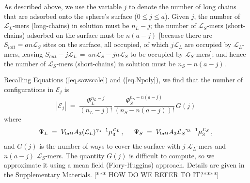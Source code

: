 \documentclass[journal=mamobx,manuscript=article]{achemso}
\newcommand{\leng}{\mathcal{L}}
\begin{document}
 As described above, we use the variable $j$ to 
 denote the number of long chains that are adsorbed
 onto the sphere's surface ($0\leq j\leq a$).
 Given $j$, the number of $\leng_L$-mers (long-chains) in solution must be $n_L-j$; 
 the number of $\leng_S$-mers (short-chains) adsorbed on the surface must be $n(a-j)$ [because there are $S_{latt}=an\leng_S$ sites on the surface, all occupied, of which $j\leng_L$ are occupied by $\leng_L$-mers, leaving $S_{latt}-j\leng_L\,=\, an\leng_S-jn\leng_S$ to be  occupied by $\leng_S$-mers]; 
 and hence the number of $\leng_S$-mers (short-chains) in solution must be  $n_S-n(a-j)$.

Recalling Equations (\ref{eq.sawscale}) and 
(\ref{eq.Npoly}), we find that the number of configurations in $\mathcal{E}_j$ is
\begin{equation}
    |\mathcal{E}_j|  
      \; = \; \frac{ \Psi_L^{n_L-j} }{(n_L-j)!} \,
          \frac{ \Psi_S^{n_S-n(a-j)} }{(n_S-n(a-j))!} \,  G(j)
        \label{eq.Yj}
\end{equation}
where 
\begin{equation}
    \label{eq.psidef}   
   \Psi_L\;=\;V_{latt} A_3 (\leng_L)^{\gamma_3-1} \mu_{3}^{\leng_L} \,,  
    \hspace{5mm} %
     \Psi_S \;=\; V_{latt}A_3{\leng_S}^{\gamma_3-1}\mu_3^{\leng_S} \,,
\end{equation}
and $G(j)$ is the number of ways to cover the surface
with $j$ $\leng_L$-mers and $n(a-j)$ $\leng_S$-mers.
The quantity $G(j)$ is difficult to compute, so we
approximate it using a mean field (Flory-Huggins) approach.  Details are given in the Supplementary 
Materials.
[*** HOW DO WE REFER TO IT?****]
\end{document}
